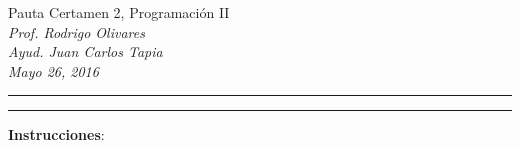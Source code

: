 \documentclass[10pt]{article}
\begin{document}
    \begin{center}
		{\Large Pauta Certamen 2, Programaci\'on II} \\
		\emph{\small Prof. Rodrigo Olivares} \\
		\emph{\small Ayud. Juan Carlos Tapia} \\
		\emph{\scriptsize Mayo 26, 2016} 
	\end{center}

	\vspace*{-35pt}
	\begin{center}
		\rule{1\textwidth}{.3pt}
	\end{center}
	\vspace*{-42pt}
	\begin{center}
		\rule{1\textwidth}{2pt}
	\end{center}

	\vspace*{-15pt}

	{\small \textbf{Instrucciones}:}

	\vspace*{-15pt}
\end{document}
